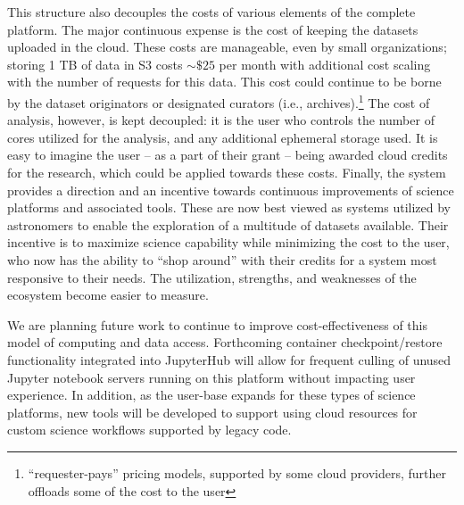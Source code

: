 \documentclass[twocolumn, linenumbers]{aastex631}
\begin{document}
This structure also decouples the costs of various elements of the complete platform. The major continuous expense is the cost of keeping the datasets uploaded in the cloud. These costs are manageable, even by small organizations; storing 1 TB of data in S3 costs ${\sim}\$25$ per month with additional cost scaling with the number of requests for this data. This cost could continue to be borne by the dataset originators or designated curators (i.e., archives).\footnote{``requester-pays'' pricing models, supported by some cloud providers, further offloads some of the cost to the user} The cost of analysis, however, is kept decoupled: it is the user who controls the number of cores utilized for the analysis, and any additional ephemeral storage used. It is easy to imagine the user -- as a part of their grant -- being awarded cloud credits for the research, which could be applied towards these costs. Finally, the system provides a direction and an incentive towards continuous improvements of science platforms and associated tools. These are now best viewed as systems utilized by astronomers to enable the exploration of a multitude of datasets available. Their incentive is to maximize science capability while minimizing the cost to the user, who now has the ability to ``shop around'' with their credits for a system most responsive to their needs. The utilization, strengths, and weaknesses of the ecosystem become easier to measure.

We are planning future work to continue to improve cost-effectiveness of this model of computing and data access. Forthcoming container checkpoint/restore functionality integrated into JupyterHub will allow for frequent culling of unused Jupyter notebook servers running on this platform without impacting user experience. In addition, as the user-base expands for these types of science platforms, new tools will be developed to support using cloud resources for custom science workflows supported by legacy code.
\end{document}
